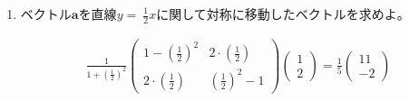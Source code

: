 \documentclass[10pt,b5paper]{ltjsarticle}
\begin{document}
\begin{enumerate}
\begin{enumerate}
       \item ベクトル$\bm{a}$を直線$y=~\frac{1}{2}x$に関して対称に移動したベクトルを求めよ。

             \begin{align}
              \frac{1}{1+\left(\frac{1}{2}\right)^2}
              \left(
                \begin{matrix}
                1-\left(\frac{1}{2}\right)^2 & 2\cdot\left(\frac{1}{2}\right)\\
                2\cdot\left(\frac{1}{2}\right)&\left(\frac{1}{2}\right)^2-1
                \end{matrix}
              \right)
              \left(\begin{matrix}1\\2\end{matrix}\right)
              = \frac{1}{5}\left(\begin{matrix}11\\-2\end{matrix}\right)
             \end{align}
      \end{enumerate}
\end{enumerate}
\end{document}
